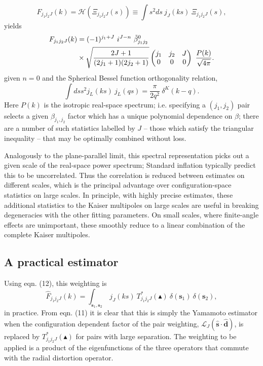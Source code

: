 \documentclass[useAMS,usenatbib]{mn2e}
\newcommand{\tj}[6]{ \begin{pmatrix}
   #1 & #2 & #3 \\
   #4 & #5 & #6 
  \end{pmatrix}}
\begin{document}
\begin{equation}
F_{j_1 j_2 J}(k) = \mathcal{H} \left ( \Xi_{j_1 j_2 J}(s) \right ) \equiv \int s^2 ds \ j_J(ks) \ \Xi_{j_1 j_2 J}(s),
\end{equation}
yields 
\begin{align}
F_{j_1 j_2 J}(k) &= (-1)^{j_1 + J} \ i^{J-n} \ \tilde{\beta}^{0}_{j_1 j_2} \notag \\ &\times \sqrt{\frac{2J+1}{(2 j_1 + 1)(2 j_2 + 1)}} \tj{j_1}{j_2}{J}{0}{0}{0} \ \frac{P(k)}{\sqrt{4 \pi}}.
\end{align}
given $n=0$ and the Spherical Bessel function orthogonality relation, 
\begin{equation}
\int ds s^2 j_L (ks) \ j_L(qs) = \frac{\pi}{2 q^2} \ \delta^{K}(k-q).
\end{equation}
Here $P(k)$ is the isotropic real-space spectrum; i.e. specifying a $(j_1, j_2)$ pair selects a given $\beta_{j_1, j_2}$ factor which has a unique polynomial dependence on $\beta$; there are a number of such statistics labelled by $J$ -- those which satisfy the triangular inequality -- that may be optimally combined without loss.  

Analogously to the plane-parallel limit, this spectral representation picks out a given scale of the real-space power spectrum; Standard inflation typically predict this to be uncorrelated.  Thus the correlation is reduced between estimates on different scales, which is the principal advantage over configuration-space statistics on large scales.  In principle, with highly precise estimates, these additional statistics to the Kaiser multipoles on large scales are useful in breaking degeneracies with the other fitting parameters.  On small scales, where finite-angle effects are unimportant, these smoothly reduce to a linear combination of the complete Kaiser multipoles. 


\subsection{A practical estimator}
Using eqn. (12), this weighting is 
\begin{equation}
\hat F_{j_1 j_2 J}(k) = \int_{\boldsymbol {s}_1, \boldsymbol {s}_2} \ j_J(ks) \ T^{*}_{j_1 j_2 J}(\blacktriangle) \ \delta(\boldsymbol {s}_1) \ \delta(\boldsymbol {s}_2), 
\end{equation}
in practice.  From eqn. (11) it is clear that this is simply the Yamamoto estimator when the configuration dependent factor of the pair weighting, $\mathcal{L}_J(\boldsymbol {\hat s} \cdot \boldsymbol {\hat d})$, is replaced by $T^{*}_{j_1 j_2 J}(\blacktriangle)$ for pairs with large separation.  The weighting to be applied is a product of the eigenfunctions of the three operators that commute with the radial distortion operator.
\end{document}
